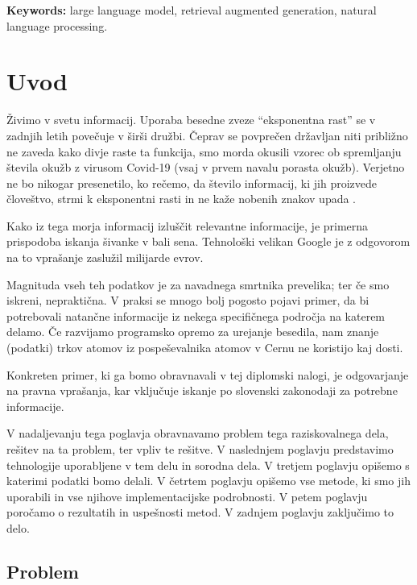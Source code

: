 \documentclass[a4paper,12pt,openright]{book}
\newcommand{\tkeywordsEn}{large language model, retrieval augmented generation, natural language processing}
\newcommand{\clearemptydoublepage}{\newpage{\pagestyle{empty}\cleardoublepage}}
\begin{document}
\noindent\textbf{Keywords:} \tkeywordsEn.
\clearemptydoublepage

\mainmatter
\setcounter{page}{1}
\pagestyle{fancy}

\chapter{Uvod}
\label{ch0}

Živimo v svetu informacij. Uporaba besedne zveze “eksponentna rast” se v zadnjih letih povečuje v širši družbi. Čeprav se povprečen državljan niti približno ne zaveda kako divje raste ta funkcija, smo morda okusili vzorec ob spremljanju števila okužb z virusom Covid-19 (vsaj v prvem navalu porasta okužb). Verjetno ne bo nikogar presenetilo, ko rečemo, da število informacij, ki jih proizvede človeštvo, strmi k eksponentni rasti in ne kaže nobenih znakov upada \cite{big_data}.

Kako iz tega morja informacij izluščit relevantne informacije, je primerna prispodoba iskanja šivanke v bali sena. Tehnološki velikan Google je z odgovorom na to vprašanje zaslužil milijarde evrov.

Magnituda vseh teh podatkov je za navadnega smrtnika prevelika; ter če smo iskreni, nepraktična. V praksi se mnogo bolj pogosto pojavi primer, da bi potrebovali natančne informacije iz nekega specifičnega področja na katerem delamo. Če razvijamo programsko opremo za urejanje besedila, nam znanje (podatki) trkov atomov iz pospeševalnika atomov v Cernu ne koristijo kaj dosti.

Konkreten primer, ki ga bomo obravnavali v tej diplomski nalogi, je odgovarjanje na pravna vprašanja, kar vključuje iskanje po slovenski zakonodaji za potrebne informacije.

V nadaljevanju tega poglavja obravnavamo problem tega raziskovalnega dela, rešitev na ta problem, ter vpliv te rešitve. V naslednjem poglavju predstavimo tehnologije uporabljene v tem delu in sorodna dela. V tretjem poglavju opišemo s katerimi podatki bomo delali. V četrtem poglavju opišemo vse metode, ki smo jih uporabili in vse njihove implementacijske podrobnosti. V petem poglavju poročamo o rezultatih in uspešnosti metod. V zadnjem poglavju zaključimo to delo.

\section{Problem}
\end{document}
